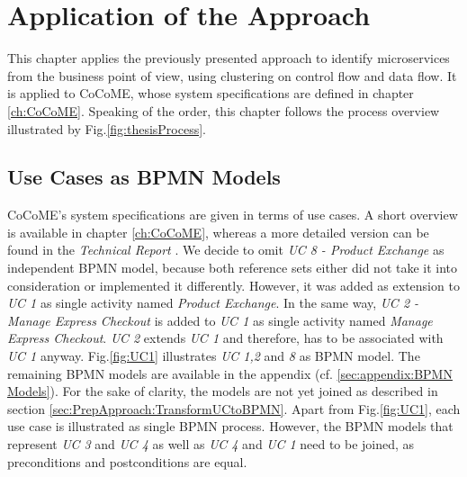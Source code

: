 \chapter{Application of the Approach}
\label{ch:SolutionApplication}
This chapter applies the previously presented approach to identify microservices from the business point of view, using clustering on control flow and data flow. It is applied to CoCoME, whose system specifications are defined in chapter \ref{ch:CoCoME}. Speaking of the order, this chapter follows the process overview illustrated by Fig.\ref{fig:thesisProcess}.

\section{Use Cases as BPMN Models}
CoCoME's system specifications are given in terms of use cases. A short overview is available in chapter \ref{ch:CoCoME}, whereas a more detailed version can be found in the \textit{Technical Report} \cite{CoCoMETechnical}. We decide to omit  \textit{UC 8 - Product Exchange} as independent BPMN model, because both reference sets either did not take it into consideration or implemented it differently. However, it was added as extension to \textit{UC 1} as single activity named \textit{Product Exchange}. In the same way, \textit{UC 2 - Manage Express Checkout} is added to \textit{UC 1} as single activity named \textit{Manage Express Checkout}. \textit{UC 2} extends \textit{UC 1} and therefore, has to be associated with \textit{UC 1} anyway.  Fig.\ref{fig:UC1} illustrates \textit{UC 1,2} and \textit{8} as BPMN model. The remaining BPMN models are available in the appendix (cf. \ref{sec:appendix:BPMN Models}). For the sake of clarity, the models are not yet joined as described in section \ref{sec:PrepApproach:TransformUCtoBPMN}. Apart from Fig.\ref{fig:UC1}, each use case is illustrated as single BPMN process. However, the BPMN models that represent \textit{UC 3} and \textit{UC 4} as well as \textit{UC 4} and \textit{UC 1} need to be joined, as preconditions and postconditions are equal. 



